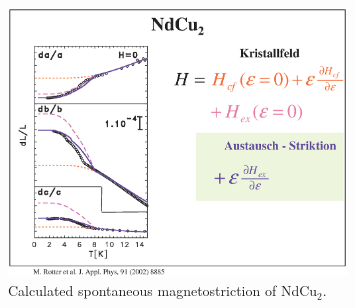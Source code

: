 \begin{figure}[htb]%
\begin{center}\leavevmode
\includegraphics[angle=0, width=0.8\textwidth]{figsrc/magnetostriction_ndcu2.eps}
\end{center}
\caption{Calculated spontaneous magnetostriction of NdCu$_2$.}
\label{magnetostrictiongraphic}
\end{figure}


